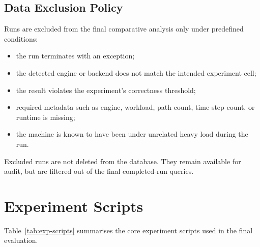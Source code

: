 \subsection{Data Exclusion Policy}

Runs are excluded from the final comparative analysis only under predefined
conditions:

\begin{itemize}
    \item the run terminates with an exception;
    \item the detected engine or backend does not match the intended
    experiment cell;
    \item the result violates the experiment's correctness threshold;
    \item required metadata such as engine, workload, path count, time-step
    count, or runtime is missing;
    \item the machine is known to have been under unrelated heavy load during
    the run.
\end{itemize}

Excluded runs are not deleted from the database.  They remain available for
audit, but are filtered out of the final completed-run queries.

\section{Experiment Scripts}
\label{sec:exp-scripts}

Table~\ref{tab:exp-scripts} summarises the core experiment scripts used in
the final evaluation.

